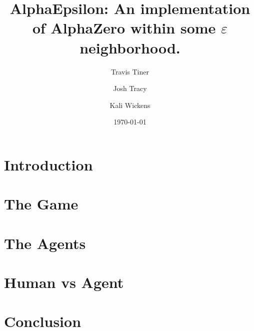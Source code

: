 \documentclass[11pt]{article}
\title{AlphaEpsilon: An implementation of AlphaZero within some $\varepsilon$ neighborhood.}
\author{Travis Tiner}
\author{Josh Tracy}
\author{Kali Wickens}
\affil{University of Utah -- Deep Learning}
\date{\today}
\begin{document}
\maketitle

\section{Introduction}

	

\section{The Game}

	

\section{The Agents}
	
	
	
	
	
	

\section{Human vs Agent}

	

\section{Conclusion}

	
%
%
%
%
%
\end{document}
